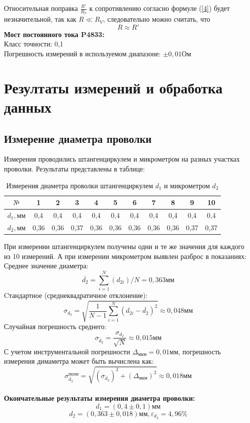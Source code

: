 \documentclass[a4paper,12pt]{article} %
\begin{document}
Относительная поправка $\frac{R'}{R_V}$ к сопротивлению согласно формуле (\ref{4}) будет незначительной, так как $R \ll R_V$, следовательно можно считать, что 
\begin{equation}
\label{5}
R \approx R'
\end{equation}
\textbf{Мост постоянного тока P4833:}\\
Класс точности: 0,1\\
Погрешность измерений в используемом диапазоне: $\pm0,01\text{Ом}$\\

\section{Резултаты измерений и обработка данных}
\subsection{Измерение диаметра проволки}
Измерения проводились штангенциркулем и микрометром на разных участках проволки. Результаты представлены в таблице:
\begin{table}[h]
\centering
\caption{Измерения диаметра проволки штангенциркулем $d_1$ и микрометром $d_2$}
\begin{tabular}{|c|c|c|c|c|c|c|c|c|c|c|}
\hline
$\text{№}$ & 1 & 2 & 3 & 4 & 5 & 6 & 7 & 8 & 9 & 10\\ \hline
$d_1, \text{мм}$ & 0,4& 0,4& 0,4& 0,4& 0,4& 0,4& 0,4& 0,4& 0,4& 0,4\\ \hline
$d_2, \text{мм}$ & 0,36 & 0,36 & 0,37 & 0,36 &0,36 &0,36&0,36&0,36&0,37&0,37\\ \hline
\end{tabular}
\end{table}

При измерении  штангенциркулем получены одни и те же значения для каждого из 10 измерений. А при измерении микрометром выявлен разброс в показаниях:\\
Среднее значение диаметра:
\[\overline{d_2} = {\sum_{i=1}^{N}(d_{2i})}/N = 0,363\text{мм}\]
Cтандартное (среднеквадратичное отклонение):
\[\sigma_{d_2} = \sqrt{\frac{1}{N-1}\sum_{i=1}^{N}(d_{2i}-\overline{d_2})^2} \approx 0,048\text{мм}\]
Случайная погрешность среднего:
\[\sigma_{\overline d_2} = \frac{\sigma_{d_2}}{\sqrt{N}} \approx 0,015\text{мм}\]
С учетом инструментальной погрешности $\Delta_\text{мкм} = 0,01\text{мм}$, погрешность измерения димаметра может быть вычислена как:
\[\sigma_{\overline d_2}^{\text{полн}} =\sqrt{(\sigma_{\overline d_2})^2 + (\Delta_\text{мкм})^2} \approx 0,018\text{мм}\]\\
\textbf{Окончательные результаты измерения диаметра проволки:}
\[d_1 = (0,4\pm 0,1)\text{мм}\]
\[d_2 = (0,363\pm 0,018)\text{мм}, \varepsilon_{d_2} = 4,96\%\]
\end{document}
